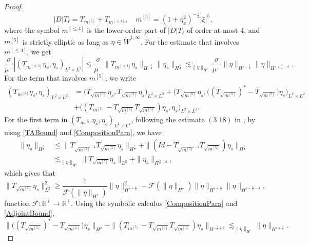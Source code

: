 \documentclass[12pt]{amsart}
\theoremstyle{definition}
\numberwithin{equation}{section}
\newcommand{\R}{\mathbb{R}}
\newcommand{\f}{\frac}
\begin{document}
\begin{proof}
\begin{equation*}
    |D|T_\ell =  T_{m^{[5]}} + T_{m^{[\leq 4]}}, \quad m^{[5]} = (1+\eta_x^2)^{-\f52}|\xi|^5,
\end{equation*}
where the symbol $m^{[\leq 4]}$ is the lower-order part of $|D|T_\ell$ of order at most $4$, and $m^{[5]}$ is strictly elliptic as long as $\eta \in \dot{W}^{1,\infty}$.
For the estimate that involves $m^{[\leq 4]}$, we get 
\begin{equation*}
 \frac{\sigma}{\mu^{-}} |(T_{m^{[\leq 4]}} \eta_s, \eta_s)_{L^2 \times L^2}| \leq \frac{\sigma}{\mu^{-}} \| T_{m^{[\leq 4]}} \eta_s\|_{H^{-\f52}} \| \eta_s\|_{H^{\f52}}  \lesssim_{\|\eta\|_{H^s}} \frac{\sigma}{\mu^{-}}\|\eta\|_{H^{s+\f52}}\| \eta\|_{H^{s+\f52-\delta}}.     
\end{equation*}
For the term that involves $m^{[5]}$, we write 
\begin{align*}
 (T_{m^{[5]}} \eta_s, \eta_s)_{L^2 \times L^2} &= \big(T_{\sqrt{m^{[5]}}} \eta_s, T_{\sqrt{m^{[5]}}}\eta_s\big)_{L^2 \times L^2} + \big(T_{\sqrt{m^{[5]}}} \eta_s, \big((T_{\sqrt{m^{[5]}}})^{*} -T_{\sqrt{m^{[5]}}}\big)\eta_s\big)_{L^2 \times L^2} \\
 &+ \big((T_{m^{[5]}}-T_{\sqrt{m^{[5]}}} T_{\sqrt{m^{[5]}}}) \eta_s, \eta_s\big)_{L^2 \times L^2}.
\end{align*}
For the first term in $(T_{m^{[5]}} \eta_s, \eta_s)_{L^2 \times L^2}$, following the estimate $(3.18)$ in \cite{MR4131404}, by uisng \eqref{TABound} and \eqref{CompositionPara}, we have
\begin{align*}
\|\eta_s\|_{H^{\f52}}&\leq
\|T_{\sqrt{m^{[5]}}^{-1}}T_{\sqrt{m^{[5]}}}\eta_s\|_{H^{\f52}}
+\|(Id-T_{\sqrt{m^{[5]}}^{-1}}T_{\sqrt{m^{[5]}}})\eta_s\|_{H^{\f52}}\\
&\lesssim_{\|\eta\|_{H^s}}\|T_{\sqrt{m^{[5]}}}\eta_s\|_{L^2}+\|\eta_s\|_{H^{\f52-\delta}},
\end{align*}
which gives that
\begin{equation*}
  \|T_{\sqrt{m^{[5]}}} \eta_s\|^2_{L^2} \geq \frac{1}{\mathcal{F}(\|\eta\|_{H^s})} \|\eta\|^2_{H^{s+\f52}} - \mathcal{F}(\|\eta\|_{H^s})\|\eta\|_{H^{s+\f52}}\| \eta\|_{H^{s+\f52-\delta}},
\end{equation*}
function $\mathcal{F}: \R^+ \rightarrow \R^+$.
Using the symbolic calculus \eqref{CompositionPara} and \eqref{AdjointBound}, 
\begin{equation*}
 \|\big((T_{\sqrt{m^{[5]}}})^{*} -T_{\sqrt{m^{[5]}}}\big)\eta_s \|_{H^\delta} + \|(T_{m^{[5]}}-T_{\sqrt{m^{[5]}}} T_{\sqrt{m^{[5]}}}) \eta_s\|_{H^{-\f52 + \delta}} \lesssim_{\|\eta\|_{H^s}}\|\eta\|_{H^{s+\f52}}.

\end{equation*}
\end{proof}
\end{document}
